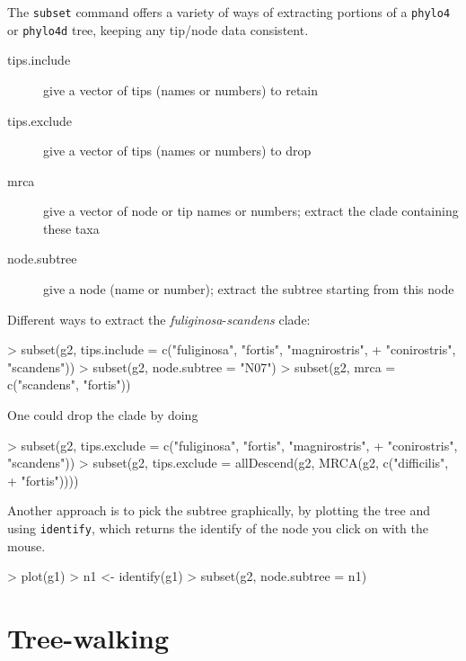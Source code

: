\documentclass{article}
\newcommand{\code}[1]{{{\tt #1}}}
\begin{document}
The \code{subset} command offers a variety of ways of extracting portions of a \code{phylo4} or \code{phylo4d} tree, keeping any tip/node data consistent.

\begin{description}
\item[tips.include]{give a vector of tips (names or numbers) to retain}
\item[tips.exclude]{give a vector of tips (names or numbers) to drop}
\item[mrca]{give a vector of node or tip names or numbers; extract the clade containing these taxa}
\item[node.subtree]{give a node (name or number); extract the subtree starting from this node}
\end{description}

Different ways to extract the \emph{fuliginosa}-\emph{scandens}
clade:
\begin{Schunk}
\begin{Sinput}
> subset(g2, tips.include = c("fuliginosa", "fortis", "magnirostris", 
+     "conirostris", "scandens"))
> subset(g2, node.subtree = "N07")
> subset(g2, mrca = c("scandens", "fortis"))
\end{Sinput}
\end{Schunk}

One could drop the clade by  doing
\begin{Schunk}
\begin{Sinput}
> subset(g2, tips.exclude = c("fuliginosa", "fortis", "magnirostris", 
+     "conirostris", "scandens"))
> subset(g2, tips.exclude = allDescend(g2, MRCA(g2, c("difficilis", 
+     "fortis"))))
\end{Sinput}
\end{Schunk}

Another approach is to pick the subtree graphically, by plotting the tree and using \code{identify}, which returns the identify of the node you click on with the mouse.

\begin{Schunk}
\begin{Sinput}
> plot(g1)
> n1 <- identify(g1)
> subset(g2, node.subtree = n1)
\end{Sinput}
\end{Schunk}

\section{Tree-walking}
\end{document}
